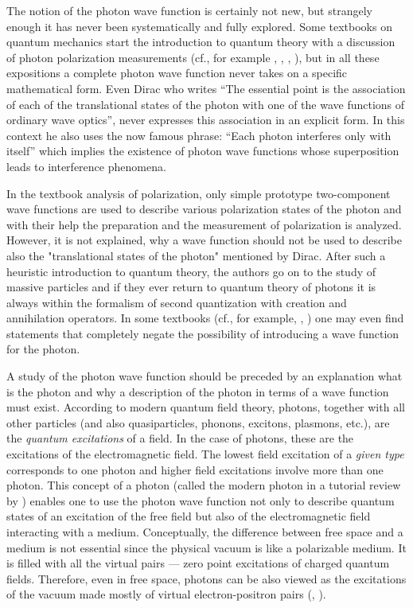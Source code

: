 \documentclass[11pt]{article}
\begin{document}
The notion of the photon wave function is certainly not new, but strangely
enough it has never been systematically and fully explored. Some textbooks
on quantum mechanics start the introduction to quantum theory with a
discussion of photon polarization measurements (cf., for example
\cite{Dirac_58}, \cite{Baym_69}, \cite{Lipkin_73}, \cite{CTDL_77}), but in
all these expositions a complete photon wave function never takes on a
specific mathematical form. Even Dirac who writes ``The essential point is
the association of each of the translational states of the photon with one
of the wave functions of ordinary wave optics'', never expresses  this association in an explicit form. In this context he also uses the now famous
phrase: ``Each photon interferes only with itself'' which implies the
existence of photon wave functions whose superposition leads to interference
phenomena.

In the textbook analysis of polarization, only simple prototype
two-com\-po\-nent wave functions are used to describe various polarization
states of the photon and with their help the preparation and the measurement
of polarization is analyzed. However, it is not explained, why a wave
function should not be used to describe also the "translational states of
the photon" mentioned by Dirac. After such a heuristic introduction to
quantum theory, the authors go on to the study of massive particles and if
they ever return to quantum theory of photons it is always within the
formalism of second quantization with creation and annihilation operators.
In some textbooks (cf., for example, \cite{Bohm_54}, \cite{Power_64}) one
may even find statements that completely negate the possibility of
introducing a wave function for the photon.

A study of the photon wave function should be preceded by an explanation
what is the photon and why a description of the photon in terms of a wave
function must exist. According to modern quantum field theory, photons,
together with all other particles (and also quasiparticles, phonons,
excitons, plasmons, etc.), are the {\em quantum excitations} of a field. In
the case of photons, these are the excitations of the electromagnetic field.
The lowest field excitation of a {\em given type} corresponds to one photon and
higher field excitations involve more than one photon. This concept of a
photon (called the modern photon in a tutorial review by \cite{KAA_89})
enables one to use the photon wave function not only to describe quantum
states of an excitation of the free field but also of the electromagnetic
field interacting with a medium. Conceptually, the difference between free
space and a medium is not essential since the physical vacuum is like a
polarizable medium. It is filled with all the virtual pairs --- zero point excitations of charged quantum fields. Therefore, even in free space, photons can be also viewed as the excitations of the vacuum made mostly of virtual
electron-positron pairs (\cite{IBB_63}, \cite{Bjorken_63}).
\end{document}

